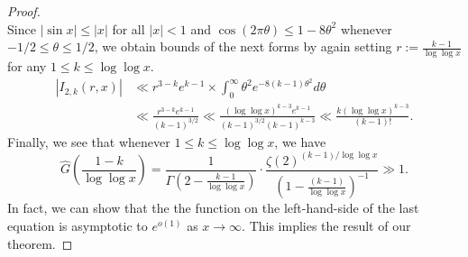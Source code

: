 \documentclass[11pt,reqno,a4letter]{article}
\numberwithin{figure}{section}
\numberwithin{table}{section}
\theoremstyle{plain}
\numberwithin{theorem}{section}
\theoremstyle{definition}
\begin{document}
\begin{proof}
\[\]
Since $|\sin x| \leq |x|$ for all $|x| < 1$ and $\cos(2\pi\theta) \leq 1 - 8\theta^2$ whenever 
$-1/2 \leq \theta \leq 1/2$, we obtain bounds of the next forms by again 
setting $r := \frac{k-1}{\log\log x}$ for any $1 \leq k \leq \log\log x$. 
\begin{align*}
|I_{2,k}(r, x)| & \ll r^{3-k} e^{k-1} \times \int_0^{\infty} \theta^2 e^{-8(k-1) \theta^2} d\theta \\ 
     & \ll \frac{r^{3-k} e^{k-1}}{(k-1)^{3/2}} \ll 
     \frac{(\log\log x)^{k-3} e^{k-1}}{(k-1)^{3/2} (k-1)^{k-3}} 
     \ll 
     \frac{k (\log\log x)^{k-3}}{(k-1)!}. 
\end{align*}
Finally, we see that whenever $1 \leq k \leq \log\log x$, we have 
\[
\widehat{G}\left(\frac{1-k}{\log\log x}\right) = \frac{1}{\Gamma\left(2-\frac{k-1}{\log\log x}\right)} \cdot 
     \frac{\zeta(2)^{(k-1)/\log\log x}}{\left(1-\frac{(k-1)}{\log\log x}\right)^{-1}} \gg 1. 
\]
In fact, we can show that the the function on the left-hand-side of the last equation is 
asymptotic to $e^{o(1)}$ as $x \rightarrow \infty$. 
This implies the result of our theorem. 
\end{proof} 
\end{document}
